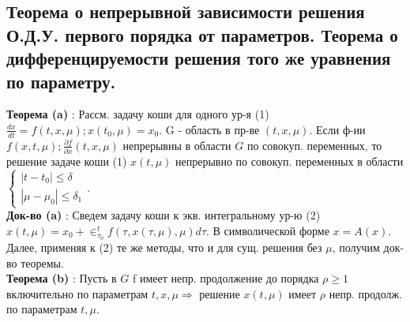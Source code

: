 \documentclass[unicode, 8pt, a4paper,oneside, landscape]{article}
\begin{document}
\begin{multicols}{4}
\subsection{Теорема о непрерывной зависимости решения О.Д.У. первого порядка от параметров. Теорема о дифференцируемости решения того же уравнения по параметру.}

{\bf Теорема (a)} : Рассм. задачу коши для одного ур-я (1) $\frac{dx}{dt} = f(t, x, \mu); x(t_0, \mu) = x_0$. G - область в пр-ве $(t, x, \mu)$. Если ф-ии $f(x, t, \mu); \frac{\partial f}{\partial x}(t, x, \mu)$ непрерывны в области $G$ по совокуп. переменных, то решение задаче коши (1) $x(t, \mu)$ непрерывно по совокуп. переменных в области $\begin{cases} |t-t_0| \leq \delta \\ |\mu - \mu_0| \leq \delta_1 \end{cases}$.\\
{\bf Док-во (a)} : Сведем задачу коши к экв. интегральному ур-ю (2) $x(t, \mu) = x_0 + \in_{\tau_0}^t f(\tau, x(\tau, \mu), \mu)d\tau$. В символической форме $x=A(x)$. Далее, применяя к (2) те же методы, что и для сущ. решения без $\mu$, получим док-во теоремы.\\
{\bf Теорема (b)} : Пусть в $G$ f имеет непр. продолжение до порядка $\rho \geq 1$ включительно по параметрам $t, x, \mu \Rightarrow$ решение $x(t, \mu)$ имеет $\rho$  непр. продолж. по параметрам $t, \mu$.











 
































   






\end{multicols}	
\end{document}
